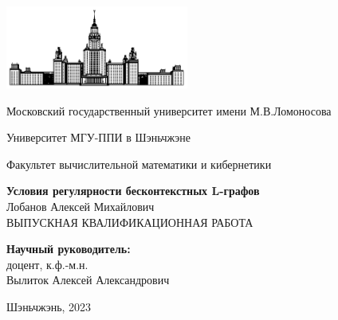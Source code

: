 
\begin{titlepage}
	\begin{center}
		\includegraphics[width=60mm]{static_images/MSU}

	    Московский государственный университет имени М.В.Ломоносова

           Университет МГУ-ППИ в Шэньчжэне 

	    
	    Факультет вычислительной математики и кибернетики

	    \bigskip
	  

	    {\Large\bfseries Условия регулярности бесконтекстных L-графов}\\[15mm]

  {\large Лобанов Алексей Михайлович}\\[5mm]

	    {ВЫПУСКНАЯ КВАЛИФИКАЦИОННАЯ РАБОТА}\\[35mm]
	       
	    

	    \begin{flushright}
	            {\bfseries Научный руководитель:}\\
	            доцент, к.ф.-м.н.\\
	            Вылиток Алексей Александрович
	    \end{flushright}

	    \vspace{\fill}
	    Шэньчжэнь, 2023
	\end{center}
\end{titlepage}

\clearpage

